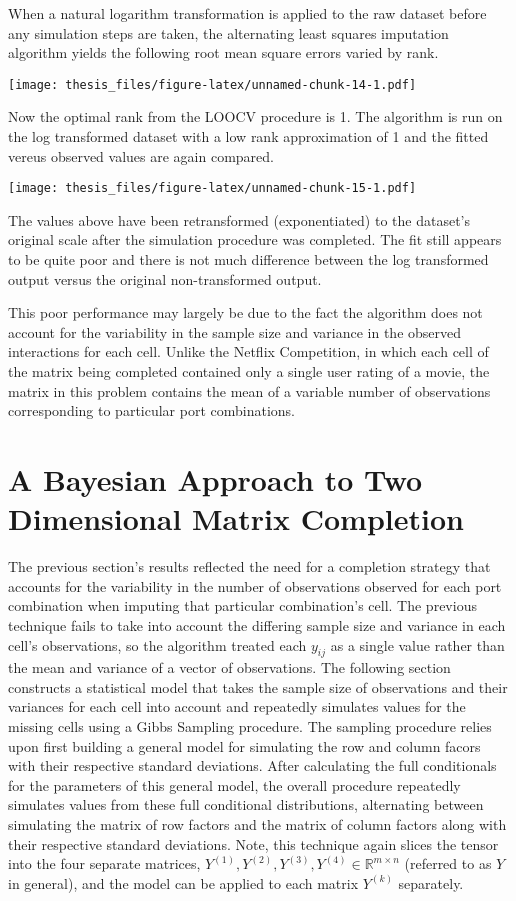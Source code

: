 \documentclass[12pt,twoside]{dukestatscithesis}
\theoremstyle{definition}
\theoremstyle{definition}
\theoremstyle{definition}
\theoremstyle{remark}
\begin{document}
When a natural logarithm transformation is applied to the raw dataset
before any simulation steps are taken, the alternating least squares
imputation algorithm yields the following root mean square errors varied
by rank.

\texttt{[image: thesis\_files/figure-latex/unnamed-chunk-14-1.pdf]}

Now the optimal rank from the LOOCV procedure is 1. The algorithm is run
on the log transformed dataset with a low rank approximation of 1 and
the fitted vereus observed values are again compared.

\texttt{[image: thesis\_files/figure-latex/unnamed-chunk-15-1.pdf]}

The values above have been retransformed (exponentiated) to the
dataset's original scale after the simulation procedure was completed.
The fit still appears to be quite poor and there is not much difference
between the log transformed output versus the original non-transformed
output.

This poor performance may largely be due to the fact the algorithm does
not account for the variability in the sample size and variance in the
observed interactions for each cell. Unlike the Netflix Competition, in
which each cell of the matrix being completed contained only a single
user rating of a movie, the matrix in this problem contains the mean of
a variable number of observations corresponding to particular port
combinations.

\chapter{A Bayesian Approach to Two Dimensional Matrix
Completion}\label{a-bayesian-approach-to-two-dimensional-matrix-completion}

The previous section's results reflected the need for a completion
strategy that accounts for the variability in the number of observations
observed for each port combination when imputing that particular
combination's cell. The previous technique fails to take into account
the differing sample size and variance in each cell's observations, so
the algorithm treated each \(y_{ij}\) as a single value rather than the
mean and variance of a vector of observations. The following section
constructs a statistical model that takes the sample size of
observations and their variances for each cell into account and
repeatedly simulates values for the missing cells using a Gibbs Sampling
procedure. The sampling procedure relies upon first building a general
model for simulating the row and column facors with their respective
standard deviations. After calculating the full conditionals for the
parameters of this general model, the overall procedure repeatedly
simulates values from these full conditional distributions, alternating
between simulating the matrix of row factors and the matrix of column
factors along with their respective standard deviations. Note, this
technique again slices the tensor into the four separate matrices,
\(Y^{(1)}, Y^{(2)}, Y^{(3)}, Y^{(4)} \in \mathbb{R}^{m \times n}\)
(referred to as \(Y\) in general), and the model can be applied to each
matrix \(Y^{(k)}\) separately.
\end{document}

